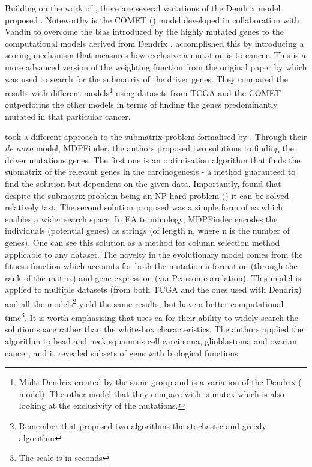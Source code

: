 Building on the work of \citet{Vandin2012-cf}, there are several variations of the Dendrix model proposed \cite{Leiserson2013-da,Szczurek2014-dh,Leiserson2015-yk}. Noteworthy is the COMET (\citet{Leiserson2015-yk}) model developed in collaboration with Vandin to overcome the bias introduced by the highly mutated genes to the computational models derived from Dendrix \cite{Vandin2012-ns}. \citet{Leiserson2015-yk} accomplished this by introducing a scoring mechanism that measures how exclusive a mutation is to cancer. This is a more advanced version of the weighting function from the original paper by \citet{Vandin2012-cf} which was used to search for the submatrix of the driver genes. They compared the results with different models\footnote{Multi-Dendrix\cite{Leiserson2013-da} created by the same group and is a variation of the Dendrix (\citet{Vandin2012-cf} model). The other model that they compare with is mutex\cite{Babur2015-qk} which is also looking at the exclusivity of the mutations.} using datasets from TCGA and the COMET outperforms the other models \cite{Leiserson2013-da,Szczurek2014-dh} in terms of finding the genes predominantly mutated in that particular cancer.

\citet{Zhao2012-wj} took a different approach to the submatrix problem formalised by \citet{Vandin2012-cf}. Through their \textit{de novo} model, MDPFinder\cite{Zhao2012-wj}, the authors proposed two solutions to finding the driver mutations genes. The first one is an optimisation algorithm that finds the submatrix of the relevant genes in the carcinogenesis - a method guaranteed to find the solution but dependent on the given data. Importantly, \citet{Zhao2012-wj} found that despite the submatrix problem being an NP-hard problem (\citet{Vandin2012-cf}) it can be solved relatively fast. The second solution proposed was a simple form of \acrfull{ea} which enables a wider search space. In EA terminology, MDPFinder encodes the individuals (potential genes) as strings (of length n, where n is the number of genes). One can see this solution as a method for column selection method applicable to any dataset. The novelty in the evolutionary model comes from the fitness function which accounts for both the mutation information (through the rank of the matrix) and gene expression (via Pearson correlation). This model is applied to multiple datasets (from both TCGA and the ones used with Dendrix\cite{Vandin2012-cf}) and all the models\footnote{Remember that \citet{Vandin2012-cf} proposed two algorithms the stochastic and greedy algorithm} yield the same results, but \citet{Zhao2012-wj} have a better computational time\footnote{The scale is in seconds}. It is worth emphasising that \citet{Zhao2012-wj} uses \acrshort{ea} for their ability to widely search the solution space rather than the white-box characteristics. The authors applied the algorithm to head and neck squamous cell carcinoma, glioblastoma and ovarian cancer, and it revealed subsets of gens with biological functions.

